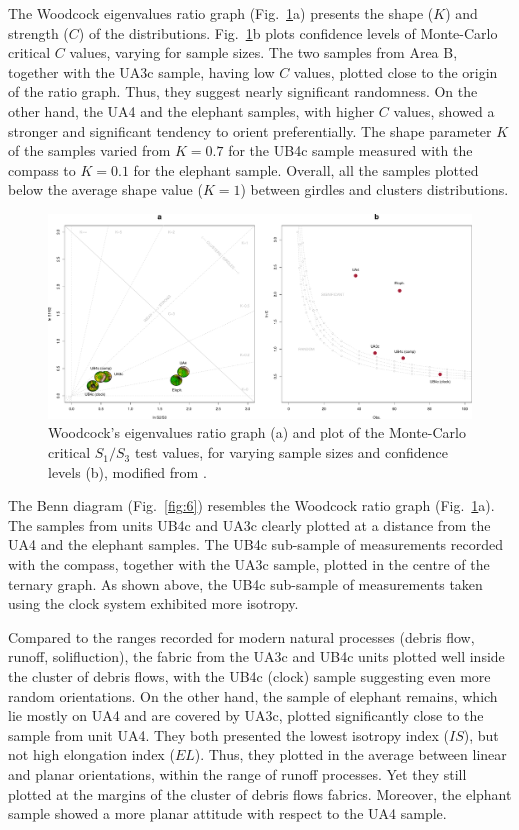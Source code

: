 \documentclass[review,authoryear,times]{elsarticle} %
\begin{document}
The Woodcock eigenvalues ratio graph (Fig.~\ref{fig:5}a) presents the shape ($K$) and strength ($C$) of the distributions. Fig.~\ref{fig:5}b plots confidence levels of Monte-Carlo critical $C$ values, varying for sample sizes. The two samples from Area B, together with the UA3c sample, having low $C$ values, plotted close to the origin of the ratio graph. Thus, they suggest nearly significant randomness. On the other hand, the UA4 and the elephant samples, with higher $C$ values, showed a stronger and significant tendency to orient preferentially. The shape parameter $K$ of the samples varied from $K=0.7$ for the UB4c sample measured with the compass to $K=0.1$ for the elephant sample. Overall, all the samples plotted below the average shape value ($K=1$) between girdles and clusters distributions.

\begin{figure}[]
  \centering
  \includegraphics[width=1\textwidth]{../artwork/Fig5_.pdf}
  \caption{Woodcock's eigenvalues ratio graph (a) and plot of the Monte-Carlo critical $S_1/S_3$ test values, for varying sample sizes and confidence levels (b), modified from \cite{Woodcock1983}.}
  \label{fig:5}
\end{figure}

The Benn diagram (Fig.~\ref{fig:6}) resembles the Woodcock ratio graph (Fig.~\ref{fig:5}a). The samples from units UB4c and UA3c clearly plotted at a distance from the UA4 and the elephant samples. The UB4c sub-sample of measurements recorded with the compass, together with the UA3c sample, plotted in the centre of the ternary graph. As shown above, the UB4c sub-sample of measurements taken using the clock system exhibited more isotropy.

Compared to the ranges recorded for modern natural processes (debris flow, runoff, solifluction), the fabric from the UA3c and UB4c units plotted well inside the cluster of debris flows, with the UB4c (clock) sample suggesting even more random orientations. On the other hand, the sample of elephant remains, which lie mostly on UA4 and are covered by UA3c, plotted significantly close to the sample from unit UA4. They both presented the lowest isotropy index ($IS$), but not high elongation index ($EL$). Thus, they plotted in the average between linear and planar orientations, within the range of runoff processes. Yet they still plotted at the margins of the cluster of debris flows fabrics. Moreover, the elphant sample showed a more planar attitude with respect to the UA4 sample.
\end{document}

